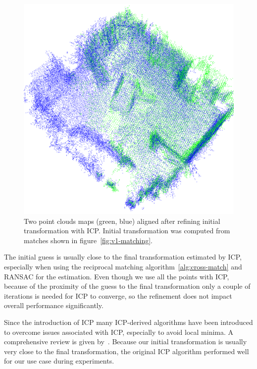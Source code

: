 \begin{figure}
    \centering
    \includegraphics[width=\textwidth]{../img/v1-refined.png}
    \caption[Aligned point clouds]{Two point clouds maps (green, blue) aligned after refining initial transformation with \gls{ICP}. Initial transformation was computed from matches shown in figure~\ref{fig:v1-matching}.}
    \label{fig:v1-refined}
\end{figure}

The initial guess is usually close to the final transformation estimated by \gls{ICP}, especially when using the reciprocal matching algorithm~\ref{alg:cross-match} and \gls{RANSAC} for the estimation. Even though we use all the points with \gls{ICP}, because of the proximity of the guess to the final transformation only a couple of iterations is needed for \gls{ICP} to converge, so the refinement does not impact overall performance significantly.

Since the introduction of \gls{ICP} many \gls{ICP}-derived algorithms have been introduced to overcome issues associated with \gls{ICP}, especially to avoid local minima. A comprehensive review is given by~\citet{pomerleau2015reviewregistration}. Because our initial transformation is usually very close to the final transformation, the original \gls{ICP} algorithm performed well for our use case during experiments.

